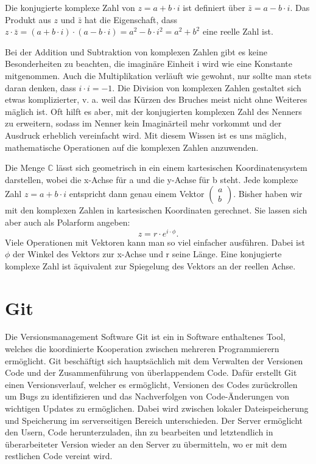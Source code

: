 \documentclass[]{dsadokumentation}
\begin{document}
Die konjugierte komplexe Zahl von $z=a+b\cdot i$ ist definiert über $\bar{z}=a-b\cdot i$. Das Produkt aus $z$ und $\bar{z}$ hat die Eigenschaft, dass $z\cdot \bar{z}=(a+b\cdot i)\cdot (a-b\cdot i)=a^2-b\cdot i^2=a^2+b^2$ eine reelle Zahl ist.

Bei der Addition und Subtraktion von komplexen Zahlen gibt es keine Besonderheiten zu beachten, die imaginäre Einheit i wird wie eine Konstante mitgenommen. Auch die Multiplikation verläuft wie gewohnt, nur sollte man stets daran denken, dass $i\cdot i=-1$.
Die Division von komplexen Zahlen gestaltet sich etwas komplizierter, v. a. weil das Kürzen des Bruches meist nicht ohne Weiteres mäglich ist. Oft hilft es aber, mit der konjugierten komplexen Zahl des Nenners zu erweitern, sodass im Nenner kein Imaginärteil mehr vorkommt und der Ausdruck erheblich vereinfacht wird. Mit diesem Wissen ist es uns mäglich, mathematische Operationen auf die komplexen Zahlen anzuwenden. 

Die Menge $\mathbb{C}$ lässt sich geometrisch in ein einem kartesischen Koordinatensystem darstellen, wobei die x-Achse für a und die y-Achse für b steht. Jede komplexe Zahl $z=a+b\cdot i$ entspricht dann genau einem Vektor $\begin{pmatrix} a\\b
\end{pmatrix}$. 
Bisher haben wir mit den komplexen Zahlen in kartesischen Koordinaten gerechnet. Sie lassen sich aber auch als Polarform angeben: 
\begin{displaymath}
z=r\cdot e^{i\cdot\phi}.
\end{displaymath}
Viele Operationen mit Vektoren kann man so viel einfacher ausführen. Dabei ist $\phi$ der Winkel des Vektors zur x-Achse und r seine Länge. Eine konjugierte komplexe Zahl ist äquivalent zur Spiegelung des Vektors an der reellen Achse.

\section{Git}
Die Versionsmanagement Software Git ist ein in Software enthaltenes Tool, welches die koordinierte Kooperation zwischen mehreren Programmierern ermöglicht. Git beschäftigt sich hauptsächlich mit dem Verwalten der Versionen Code und der Zusammenführung von überlappendem Code. Dafür erstellt Git einen Versionsverlauf, welcher es ermöglicht, Versionen des Codes zurückrollen um Bugs zu identifizieren und das Nachverfolgen von Code-Änderungen von wichtigen Updates zu ermöglichen. Dabei wird zwischen lokaler Dateispeicherung und Speicherung im serverseitigen Bereich unterschieden. Der Server ermöglicht den Usern, Code herunterzuladen, ihn zu bearbeiten und letztendlich in überarbeiteter Version wieder an den Server zu übermitteln, wo er mit dem restlichen Code vereint wird.
\end{document}
